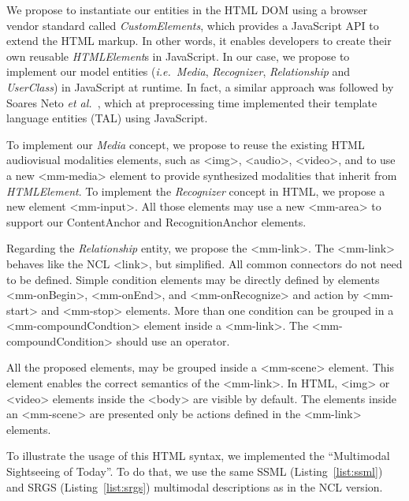 \documentclass[
  doutorado,
  american
]{ThesisPUC}
\newcommand{\lis}[1]{Listing~\ref{#1}}
\begin{document}

We propose to instantiate our entities in the HTML DOM using a browser vendor
standard called \textit{CustomElements}\footnotemark, which provides a 
JavaScript API to extend the HTML markup. In other words, it enables developers 
to create their own reusable \textit{HTMLElement}s in JavaScript. In our case, 
we propose to implement our model entities (\textit{i.e.}~\textit{Media}, 
\textit{Recognizer}, \textit{Relationship} and \textit{UserClass}) in 
JavaScript at runtime. In fact, a similar approach was followed by Soares Neto 
\textit{et al.}~\cite{neto_tal_2012}, which at preprocessing time implemented 
their template language entities (TAL) using JavaScript. 


To implement our \textit{Media} concept, we propose to reuse the existing HTML
audiovisual modalities elements, such as <img>, <audio>, <video>, and to use a
new <mm-media> element to provide synthesized modalities that inherit from
\textit{HTMLElement}. To implement the \textit{Recognizer} concept in HTML, we 
propose a new
element <mm-input>. All those elements may use a new <mm-area> to support our
ContentAnchor and RecognitionAnchor elements.

Regarding the \textit{Relationship} entity, we propose the <mm-link>. The
<mm-link> behaves like the NCL <link>, but simplified. All common connectors do
not need to be defined. Simple condition elements may be directly defined by
elements <mm-onBegin>, <mm-onEnd>, and <mm-onRecognize> and action by <mm-start>
and <mm-stop> elements. More than one condition can be grouped in a
<mm-compoundCondtion> element inside a <mm-link>. The <mm-compoundCondition>
should use an operator. 

All the proposed elements, may be grouped inside a <mm-scene> element. This
element enables the correct semantics of the <mm-link>. In HTML, <img> or
<video> elements inside the <body> are visible by default. The elements inside
an <mm-scene> are presented only be actions defined in the <mm-link> elements.

To illustrate the usage of this HTML syntax, we implemented the “Multimodal
Sightseeing of Today”. To do that, we use the same SSML (\lis{list:ssml}) and
SRGS (\lis{list:srgs}) multimodal descriptions as in the NCL version. 
\end{document}
